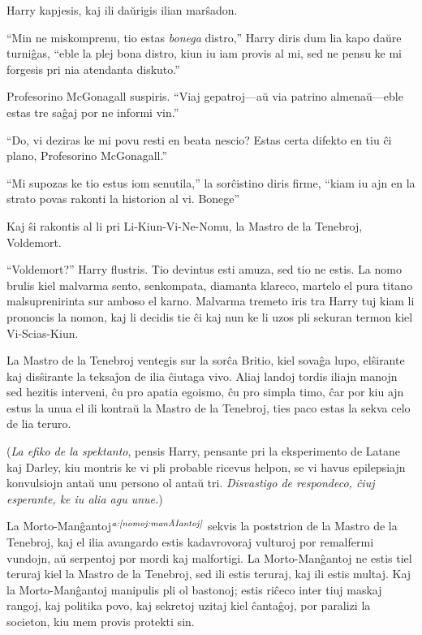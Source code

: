 Harry kapjesis, kaj ili daŭrigis ilian marŝadon.

``Min ne miskomprenu, tio estas \emph{bonega} distro,'' Harry diris
dum lia kapo daŭre turniĝas, ``eble la plej bona distro, kiun iu iam
provis al mi, sed ne pensu ke mi forgesis pri nia atendanta diskuto.''

Profesorino McGonagall suspiris. ``Viaj gepatroj—aŭ via patrino
almenaŭ—eble estas tre saĝaj por ne informi vin.''

``Do, vi deziras ke mi povu resti en beata nescio? Estas certa
difekto en tiu ĉi plano, Profesorino McGonagall.''

``Mi supozas ke tio estus iom senutila,'' la sorĉistino diris firme,
``kiam iu ajn en la strato povas rakonti la historion al vi. Bonege''

Kaj ŝi rakontis al li pri Li-Kiun-Vi-Ne-Nomu, la Mastro de la
Tenebroj, Voldemort.

``Voldemort?'' Harry flustris. Tio devintus esti amuza, sed tio ne
estis. La nomo brulis kiel malvarma sento, senkompata, diamanta
klareco, martelo el pura titano malsuprenirinta sur amboso el
karno. Malvarma tremeto iris tra Harry tuj kiam li prononcis la nomon,
kaj li decidis tie ĉi kaj nun ke li uzos pli sekuran termon kiel
Vi-Scias-Kiun.

La Mastro de la Tenebroj ventegis sur la sorĉa Britio, kiel sovaĝa
lupo, elŝirante kaj disŝirante la teksaĵon de ilia ĉiutaga vivo. Aliaj
landoj tordis iliajn manojn sed hezitis interveni, ĉu pro apatia
egoismo, ĉu pro simpla timo, ĉar por kiu ajn estus la unua el ili
kontraŭ la Mastro de la Tenebroj, ties paco estas la sekva celo de
lia teruro.

(\emph{La efiko de la spektanto}, pensis Harry, pensante pri la
eksperimento de Latane kaj Darley, kiu montris ke vi pli probable
ricevus helpon, se vi havus epilepsiajn konvulsiojn antaŭ unu persono
ol antaŭ tri. \emph {Disvastigo de respondeco, ĉiuj esperante, ke iu
alia agu unue.})

La Morto-Manĝantoj$^{\textit{a:\ref{nomoj:manĝantoj}}}$ sekvis la poststrion de la
Mastro de la Tenebroj, kaj el ilia avangardo estis kadavrovoraj
vulturoj por remalfermi vundojn, aŭ serpentoj por mordi kaj
malfortigi. La Morto-Manĝantoj ne estis tiel teruraj kiel la Mastro de
la Tenebroj, sed ili estis teruraj, kaj ili estis multaj. Kaj la
Morto-Manĝantoj manipulis pli ol bastonoj; estis riĉeco inter tiuj
maskaj rangoj, kaj politika povo, kaj sekretoj uzitaj kiel ĉantaĝoj,
por paralizi la societon, kiu mem provis protekti sin.

